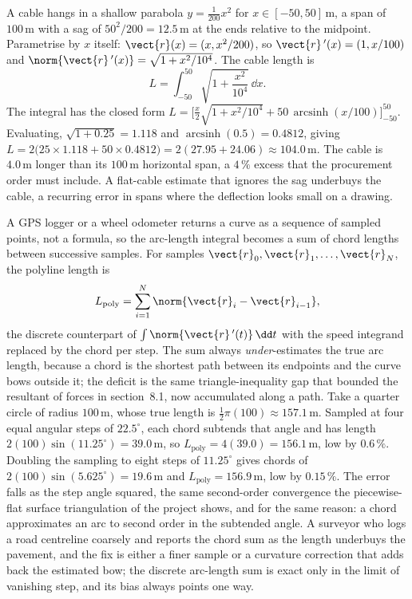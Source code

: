 \begin{example}
A cable hangs in a shallow parabola $y = \tfrac{1}{200}x^{2}$ for
$x \in [-50, 50]\,\si{\meter}$, a span of $100\,\si{\meter}$ with a
sag of $50^{2}/200 = 12.5\,\si{\meter}$ at the ends relative to the
midpoint. Parametrise by $x$ itself: $\vect{r}(x) = (x,
x^{2}/200)$, so $\vect{r}\,'(x) = (1, x/100)$ and
$\norm{\vect{r}\,'(x)} = \sqrt{1 + x^{2}/10^{4}}$. The cable length is
\[
L = \int_{-50}^{50}\sqrt{1 + \frac{x^{2}}{10^{4}}}\,\dd x.
\]
The integral has the closed form $L = \big[\tfrac{x}{2}\sqrt{1 +
x^{2}/10^{4}} + 50\,\operatorname{arcsinh}(x/100)\big]_{-50}^{50}$.
Evaluating, $\sqrt{1 + 0.25} = 1.118$ and
$\operatorname{arcsinh}(0.5) = 0.4812$, giving
$L = 2\big(25\times 1.118 + 50\times 0.4812\big) = 2(27.95 + 24.06)
\approx 104.0\,\si{\meter}$. The cable is $4.0\,\si{\meter}$ longer
than its $100\,\si{\meter}$ horizontal span, a $4\,\%$ excess that
the procurement order must include. A flat-cable estimate that
ignores the sag underbuys the cable, a recurring error in spans where
the deflection looks small on a drawing.
\end{example}

\begin{example}
A GPS logger or a wheel odometer returns a curve as a sequence of
sampled points, not a formula, so the arc-length integral becomes a sum
of chord lengths between successive samples. For samples $\vect{r}_{0},
\vect{r}_{1}, \ldots, \vect{r}_{N}$, the polyline length is
\[
L_{\text{poly}} = \sum_{i=1}^{N}\norm{\vect{r}_{i} - \vect{r}_{i-1}},
\]
the discrete counterpart of $\int\norm{\vect{r}\,'(t)}\,\dd t$ with the
speed integrand replaced by the chord per step. The sum always
\emph{under}-estimates the true arc length, because a chord is the
shortest path between its endpoints and the curve bows outside it; the
deficit is the same triangle-inequality gap that bounded the resultant
of forces in section~8.1, now accumulated along a path. Take a quarter
circle of radius $100\,\si{\meter}$, whose true length is $\tfrac{1}{2}
\pi(100) \approx 157.1\,\si{\meter}$. Sampled at four equal angular
steps of $22.5^{\circ}$, each chord subtends that angle and has length
$2(100)\sin(11.25^{\circ}) = 39.0\,\si{\meter}$, so $L_{\text{poly}} =
4(39.0) = 156.1\,\si{\meter}$, low by $0.6\,\%$. Doubling the sampling
to eight steps of $11.25^{\circ}$ gives chords of $2(100)\sin(5.625
^{\circ}) = 19.6\,\si{\meter}$ and $L_{\text{poly}} = 156.9\,\si{\meter}$,
low by $0.15\,\%$. The error falls as the step angle squared, the same
second-order convergence the piecewise-flat surface triangulation of the
project shows, and for the same reason: a chord approximates an arc to
second order in the subtended angle. A surveyor who logs a road
centreline coarsely and reports the chord sum as the length underbuys
the pavement, and the fix is either a finer sample or a curvature
correction that adds back the estimated bow; the discrete arc-length sum
is exact only in the limit of vanishing step, and its bias always points
one way.
\end{example}

